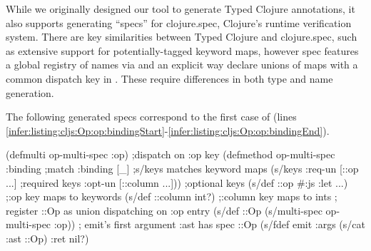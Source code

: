 \label{infer:sec:spec-extension}

While we originally designed our tool to generate Typed Clojure annotations,
it also supports generating ``specs'' for clojure.spec, Clojure's runtime
verification system.
There are key similarities between Typed Clojure and clojure.spec,
such as extensive support for potentially-tagged keyword maps,
however spec features a global registry of names
via  and
an explicit way declare unions of maps with a common
dispatch key in .
These require differences in both type and name generation.

The following generated specs 
correspond to the first  case
of 
(lines \ref{infer:listing:cljs:Op:op:bindingStart}-\ref{infer:listing:cljs:Op:op:bindingEnd}).
\begin{cljlistingnumbered}
  (defmulti op-multi-spec :op) ;dispatch on :op key
  (defmethod op-multi-spec :binding ;match :binding
    [_] ;s/keys matches keyword maps
    (s/keys :req-un [::op ...] ;required keys
            :opt-un [::column ...])) ;optional keys
  (s/def ::op #{:js :let ...}) ;:op key maps to keywords
  (s/def ::column int?) ;:column key maps to ints
  ; register ::Op as union dispatching on :op entry
  (s/def ::Op (s/multi-spec op-multi-spec :op))
  ; emit's first argument :ast has spec ::Op
  (s/fdef emit :args (s/cat :ast ::Op) :ret nil?)
\end{cljlistingnumbered}




%

